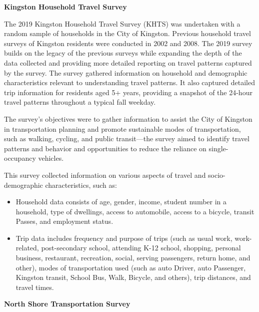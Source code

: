 \documentclass[12pt,twoside]{reedthesis}
\begin{document}
\textbf{Kingston Household Travel Survey}

The 2019 Kingston Household Travel Survey (KHTS) was undertaken with a random sample of households in the City of Kingston. Previous household travel surveys of Kingston residents were conducted in 2002 and 2008. The 2019 survey builds on the legacy of the previous surveys while expanding the depth of the data collected and providing more detailed reporting on travel patterns captured by the survey. The survey gathered information on household and demographic characteristics relevant to understanding travel patterns. It also captured detailed trip information for residents aged 5+ years, providing a snapshot of the 24-hour travel patterns throughout a typical fall weekday.

The survey's objectives were to gather information to assist the City of Kingston in transportation planning and promote sustainable modes of transportation, such as walking, cycling, and public transit---the survey aimed to identify travel patterns and behavior and opportunities to reduce the reliance on single-occupancy vehicles.

This survey collected information on various aspects of travel and socio-demographic characteristics, such as:
\begin{itemize}
\item
  Household data consists of age, gender, income, student number in a household, type of dwellings, access to automobile, access to a bicycle, transit Passes, and employment status.
\item
  Trip data includes frequency and purpose of trips (such as usual work, work-related, post-secondary school, attending K-12 school, shopping, personal business, restaurant, recreation, social, serving passengers, return home, and other), modes of transportation used (such as auto Driver, auto Passenger, Kingston transit, School Bus, Walk, Bicycle, and others), trip distances, and travel times.
\end{itemize}
\textbf{North Shore Transportation Survey}
\end{document}
